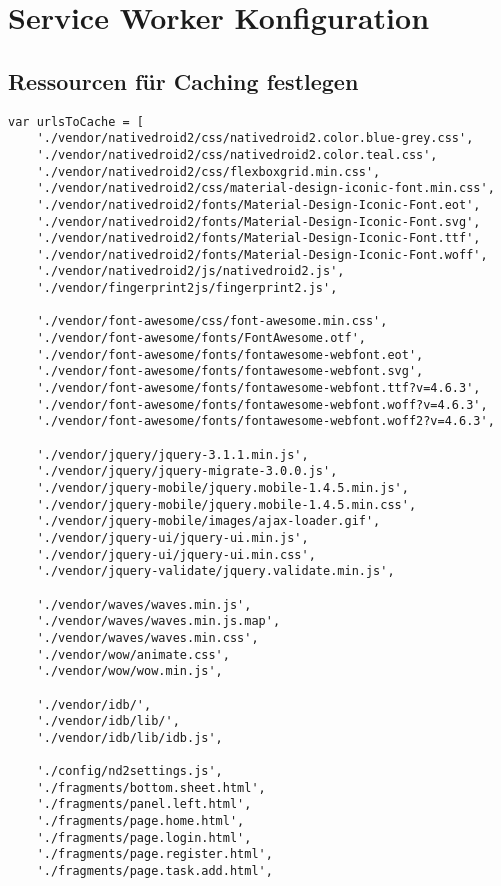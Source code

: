 \section{Service Worker Konfiguration}
\subsection{Ressourcen für Caching festlegen}
\label{subsec_a3_caching}

\begin{lstlisting}[caption={Service Worker Konfiguration - Ressourcen für Caching},label={lst_a3_sw-caching}, frame=single]
var urlsToCache = [
    './vendor/nativedroid2/css/nativedroid2.color.blue-grey.css',
    './vendor/nativedroid2/css/nativedroid2.color.teal.css',
    './vendor/nativedroid2/css/flexboxgrid.min.css',
    './vendor/nativedroid2/css/material-design-iconic-font.min.css',
    './vendor/nativedroid2/fonts/Material-Design-Iconic-Font.eot',
    './vendor/nativedroid2/fonts/Material-Design-Iconic-Font.svg',
    './vendor/nativedroid2/fonts/Material-Design-Iconic-Font.ttf',
    './vendor/nativedroid2/fonts/Material-Design-Iconic-Font.woff',
    './vendor/nativedroid2/js/nativedroid2.js',
    './vendor/fingerprint2js/fingerprint2.js',

    './vendor/font-awesome/css/font-awesome.min.css',
    './vendor/font-awesome/fonts/FontAwesome.otf',
    './vendor/font-awesome/fonts/fontawesome-webfont.eot',
    './vendor/font-awesome/fonts/fontawesome-webfont.svg',
    './vendor/font-awesome/fonts/fontawesome-webfont.ttf?v=4.6.3',
    './vendor/font-awesome/fonts/fontawesome-webfont.woff?v=4.6.3',
    './vendor/font-awesome/fonts/fontawesome-webfont.woff2?v=4.6.3',

    './vendor/jquery/jquery-3.1.1.min.js',
    './vendor/jquery/jquery-migrate-3.0.0.js',
    './vendor/jquery-mobile/jquery.mobile-1.4.5.min.js',
    './vendor/jquery-mobile/jquery.mobile-1.4.5.min.css',
    './vendor/jquery-mobile/images/ajax-loader.gif',
    './vendor/jquery-ui/jquery-ui.min.js',
    './vendor/jquery-ui/jquery-ui.min.css',
    './vendor/jquery-validate/jquery.validate.min.js',

    './vendor/waves/waves.min.js',
    './vendor/waves/waves.min.js.map',
    './vendor/waves/waves.min.css',
    './vendor/wow/animate.css',
    './vendor/wow/wow.min.js',

    './vendor/idb/',
    './vendor/idb/lib/',
    './vendor/idb/lib/idb.js',

    './config/nd2settings.js',
    './fragments/bottom.sheet.html',
    './fragments/panel.left.html',
    './fragments/page.home.html',
    './fragments/page.login.html',
    './fragments/page.register.html',
    './fragments/page.task.add.html',


\end{lstlisting}
